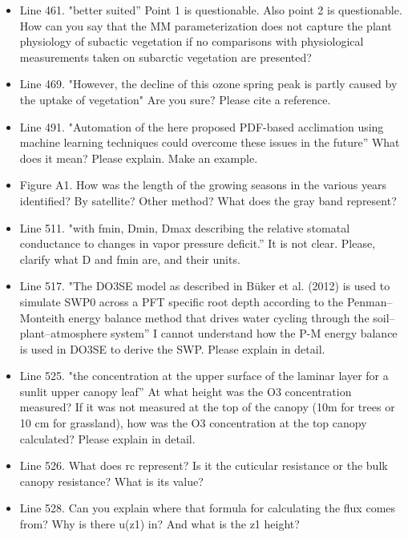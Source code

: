 \documentclass{scrartcl}
\begin{document}
\begin{itemize}
\item {\color{blue}Line 461. "better suited” Point 1 is questionable.
Also point 2 is questionable. How can you say that the MM parameterization does not
capture the plant physiology of subactic vegetation if no comparisons with physiological measurements taken on subarctic vegetation are presented?}

\item {\color{blue}Line 469. "However, the decline of this ozone spring peak is partly caused by the uptake of vegetation" Are you sure? Please cite a reference.}

\item {\color{blue}Line 491. "Automation of the here proposed PDF-based acclimation using machine learning techniques could overcome these issues in the future”
What does it mean? Please explain. Make an example.}

\item {\color{blue}Figure A1. How was the length of the growing seasons in the various years identified? By satellite? Other method? What does the gray band represent?}

\item {\color{blue}Line 511. "with fmin, Dmin, Dmax describing the relative stomatal conductance to changes in vapor pressure deficit.” It is not clear. Please, clarify what D and fmin are, and their units.}

\item {\color{blue}Line 517. "The DO3SE model as described in Büker et al. (2012) is used to simulate SWP0 across a PFT specific root depth according to the Penman--Monteith energy balance method that drives water cycling through the soil--plant--atmosphere system” I cannot understand how the P-M energy balance is used in DO3SE to derive the SWP. Please explain in detail.}

\item {\color{blue}Line 525.  "the concentration at the upper surface of the laminar layer for a sunlit upper canopy leaf” At what height was the O3 concentration measured? If it was not measured at the top of the canopy (10m for trees or 10 cm for grassland), how was the O3 concentration at the top canopy calculated?
Please explain in detail.}

\item {\color{blue}Line 526.  What does rc represent? Is it the cuticular resistance or the bulk canopy resistance? What is its value?}

\item {\color{blue}Line 528.  Can you explain where that formula for calculating the flux comes from? Why is there u(z1) in? And what is the z1 height?}


\end{itemize}
\end{document}
